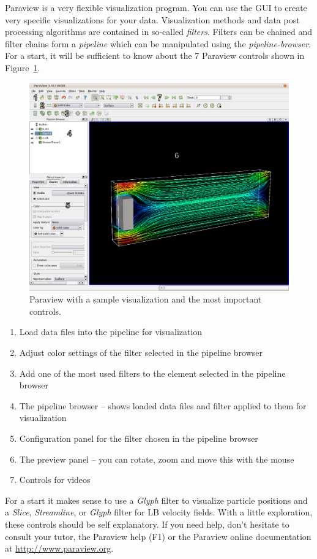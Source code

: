 Paraview is a very flexible visualization program. You can use the GUI to create very specific visualizations for your data. Visualization methods and data post processing algorithms are contained in so-called \textit{filters}. Filters can be chained and filter chains form a \textit{pipeline} which can be manipulated using the \textit{pipeline-browser}. For a start, it will be sufficient to know about the 7 Paraview controls shown in Figure~\ref{fig:paraview}.
%
\begin{figure}[htp]
\begin{center}
  \includegraphics[width=1.0\textwidth]{figures/paraview.pdf}
  \caption{Paraview with a sample visualization and the most important controls.}
  \label{fig:paraview}
\end{center}
\end{figure}
%
\begin{enumerate}
\item Load data files into the pipeline for visualization
\item Adjust color settings of the filter selected in the pipeline browser
\item Add one of the most used filters to the element selected in the pipeline browser
\item The pipeline browser -- shows loaded data files and filter applied to them for visualization
\item Configuration panel for the filter chosen in the pipeline browser
\item The preview panel -- you can rotate, zoom and move this with the mouse
\item Controls for videos
\end{enumerate}
%
For a start it makes sense to use a \textit{Glyph} filter to visualize particle positions and a \textit{Slice}, \textit{Streamline}, or \textit{Glyph} filter for LB velocity fields. With a little exploration, these controls should be self explanatory. If you need help, don't hesitate to consult your tutor, the Paraview help (F1) or the Paraview online documentation at \href{http://www.paraview.org}{http://www.paraview.org}.

\pagebreak

